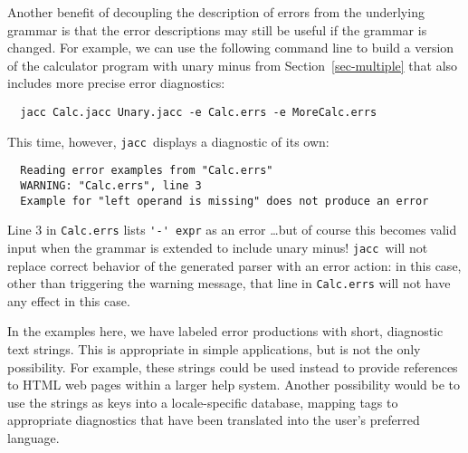 \documentclass[12pt]{article}
\def\jacc{{\tt jacc}}
\begin{document}
Another benefit of decoupling the description of errors from
the underlying grammar is that the error descriptions may
still be useful if the grammar is changed.  For example, we can
use the following command line to build a version of the calculator
program with unary minus from Section~\ref{sec-multiple} that also
includes more precise error diagnostics:
{\small
\begin{verbatim}
  jacc Calc.jacc Unary.jacc -e Calc.errs -e MoreCalc.errs
\end{verbatim}
}%
This time, however, \jacc\ displays a diagnostic of its own:
{\small
\begin{verbatim}
  Reading error examples from "Calc.errs"
  WARNING: "Calc.errs", line 3
  Example for "left operand is missing" does not produce an error
\end{verbatim}
}%
Line 3 in \verb"Calc.errs" lists \verb"'-' expr" as an error \ldots but of
course this becomes valid input when the grammar is extended to
include unary minus!  \jacc\ will not replace correct behavior of the
generated parser with an error action:  in this case, other than
triggering the warning message, that line in \verb"Calc.errs" will
not have any effect in this case.

In the examples here, we have labeled error productions with short,
diagnostic text strings.  This is appropriate in simple applications,
but is not the only possibility.  For example, these strings could be
used instead to provide references to HTML web pages within a larger
help system.  Another possibility would be to use the strings as keys
into a locale-specific database, mapping tags to appropriate diagnostics
that have been translated into the user's preferred language.

{\sloppy\raggedright


}

\end{document}
